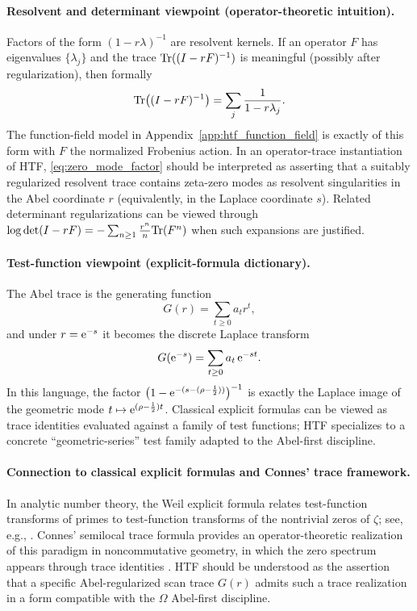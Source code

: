 \paragraph{Resolvent and determinant viewpoint (operator-theoretic intuition).}
Factors of the form $(1-r\lambda)^{-1}$ are resolvent kernels.
If an operator $F$ has eigenvalues $\{\lambda_j\}$ and the trace $\mathrm{Tr}((I-rF)^{-1})$ is meaningful (possibly after regularization), then formally
\[
\mathrm{Tr}\bigl((I-rF)^{-1}\bigr)=\sum_j \frac{1}{1-r\lambda_j}.
\]
The function-field model in Appendix~\ref{app:htf_function_field} is exactly of this form with $F$ the normalized Frobenius action.
In an operator-trace instantiation of HTF, \eqref{eq:zero_mode_factor} should be interpreted as asserting that a suitably regularized resolvent trace contains zeta-zero modes as resolvent singularities in the Abel coordinate $r$ (equivalently, in the Laplace coordinate $s$).
Related determinant regularizations can be viewed through $\log\det(I-rF)=-\sum_{n\ge 1}\frac{r^n}{n}\mathrm{Tr}(F^n)$ when such expansions are justified.

\paragraph{Test-function viewpoint (explicit-formula dictionary).}
The Abel trace is the generating function
\[
G(r)=\sum_{t\ge 0} a_t r^t,
\]
and under $r=\mathrm{e}^{-s}$ it becomes the discrete Laplace transform
\[
G(\mathrm{e}^{-s})=\sum_{t\ge 0} a_t\,\mathrm{e}^{-st}.
\]
In this language, the factor $\bigl(1-\mathrm{e}^{-(s-(\rho-\frac12))}\bigr)^{-1}$ is exactly the Laplace image of the geometric mode $t\mapsto \mathrm{e}^{(\rho-\frac12)t}$.
Classical explicit formulas can be viewed as trace identities evaluated against a family of test functions; HTF specializes to a concrete ``geometric-series'' test family adapted to the Abel-first discipline.

\paragraph{Connection to classical explicit formulas and Connes' trace framework.}
In analytic number theory, the Weil explicit formula relates test-function transforms of primes to test-function transforms of the nontrivial zeros of $\zeta$; see, e.g., \cite{Titchmarsh1986,IwaniecKowalski2004}.
Connes' semilocal trace formula provides an operator-theoretic realization of this paradigm in noncommutative geometry, in which the zero spectrum appears through trace identities \cite{Connes1999}.
HTF should be understood as the assertion that a specific Abel-regularized scan trace $G(r)$ admits such a trace realization in a form compatible with the $\Omega$ Abel-first discipline.

